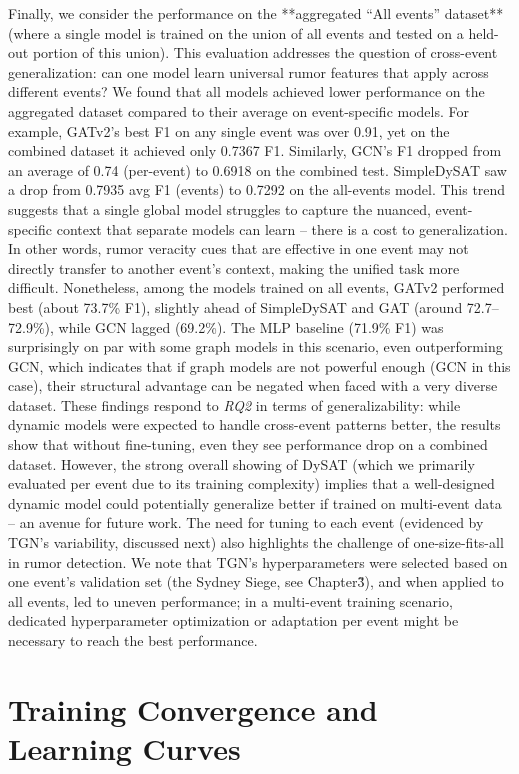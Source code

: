 \documentclass{cshonours}
\begin{document}
Finally, we consider the performance on the **aggregated “All events” dataset** (where a single model is trained on the union of all events and tested on a held-out portion of this union). This evaluation addresses the question of cross-event generalization: can one model learn universal rumor features that apply across different events? We found that all models achieved lower performance on the aggregated dataset compared to their average on event-specific models. For example, GATv2’s best F1 on any single event was over 0.91, yet on the combined dataset it achieved only 0.7367 F1. Similarly, GCN’s F1 dropped from an average of 0.74 (per-event) to 0.6918 on the combined test. SimpleDySAT saw a drop from 0.7935 avg F1 (events) to 0.7292 on the all-events model. This trend suggests that a single global model struggles to capture the nuanced, event-specific context that separate models can learn – there is a cost to generalization. In other words, rumor veracity cues that are effective in one event may not directly transfer to another event’s context, making the unified task more difficult. Nonetheless, among the models trained on all events, GATv2 performed best (about 73.7\% F1), slightly ahead of SimpleDySAT and GAT (around 72.7–72.9\%), while GCN lagged (69.2\%). The MLP baseline (71.9\% F1) was surprisingly on par with some graph models in this scenario, even outperforming GCN, which indicates that if graph models are not powerful enough (GCN in this case), their structural advantage can be negated when faced with a very diverse dataset. These findings respond to \emph{RQ2} in terms of generalizability: while dynamic models were expected to handle cross-event patterns better, the results show that without fine-tuning, even they see performance drop on a combined dataset. However, the strong overall showing of DySAT (which we primarily evaluated per event due to its training complexity) implies that a well-designed dynamic model could potentially generalize better if trained on multi-event data – an avenue for future work. The need for tuning to each event (evidenced by TGN’s variability, discussed next) also highlights the challenge of one-size-fits-all in rumor detection. We note that TGN’s hyperparameters were selected based on one event’s validation set (the Sydney Siege, see Chapter\~3), and when applied to all events, led to uneven performance; in a multi-event training scenario, dedicated hyperparameter optimization or adaptation per event might be necessary to reach the best performance.

\section{Training Convergence and Learning Curves}
\end{document}
